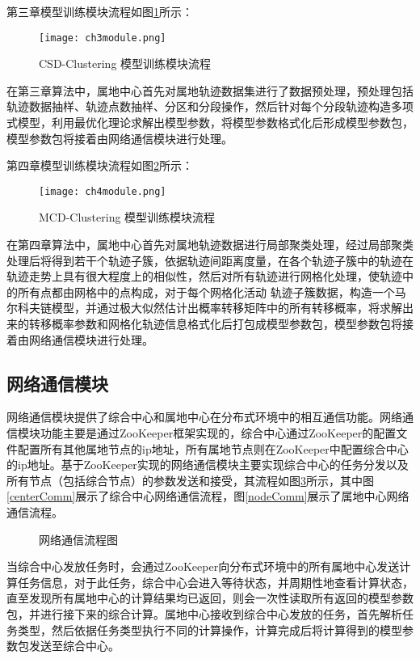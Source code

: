 第三章模型训练模块流程如图\ref{ch3module}所示：
\begin{figure}[h]
	\texttt{[image: ch3module.png]}
	\caption{CSD-Clustering 模型训练模块流程}
	\label{ch3module}
\end{figure}

在第三章算法中，属地中心首先对属地轨迹数据集进行了数据预处理，预处理包括轨迹数据抽样、轨迹点数抽样、分区和分段操作，然后针对每个分段轨迹构造多项式模型，利用最优化理论求解出模型参数，将模型参数格式化后形成模型参数包，模型参数包将接着由网络通信模块进行处理。

第四章模型训练模块流程如图\ref{ch4module}所示：
\begin{figure}[h]
	\texttt{[image: ch4module.png]}
	\caption{MCD-Clustering 模型训练模块流程}
	\label{ch4module}
\end{figure}

在第四章算法中，属地中心首先对属地轨迹数据进行局部聚类处理，经过局部聚类处理后将得到若干个轨迹子簇，依据轨迹间距离度量，在各个轨迹子簇中的轨迹在轨迹走势上具有很大程度上的相似性，然后对所有轨迹进行网格化处理，使轨迹中的所有点都由网格中的点构成，对于每个网格化活动 轨迹子簇数据，构造一个马尔科夫链模型，并通过极大似然估计出概率转移矩阵中的所有转移概率，将求解出来的转移概率参数和网格化轨迹信息格式化后打包成模型参数包，模型参数包将接着由网络通信模块进行处理。

\subsection{网络通信模块}

网络通信模块提供了综合中心和属地中心在分布式环境中的相互通信功能。网络通信模块功能主要是通过ZooKeeper框架实现的，综合中心通过ZooKeeper的配置文件配置所有其他属地节点的ip地址，所有属地节点则在ZooKeeper中配置综合中心的ip地址。基于ZooKeeper实现的网络通信模块主要实现综合中心的任务分发以及所有节点（包括综合节点）的参数发送和接受，其流程如图\ref{comm}所示，其中图\ref{centerComm}展示了综合中心网络通信流程，图\ref{nodeComm}展示了属地中心网络通信流程。
\begin{figure}[h]
\caption{网络通信流程图}
\label{comm}
\end{figure}

当综合中心发放任务时，会通过ZooKeeper向分布式环境中的所有属地中心发送计算任务信息，对于此任务，综合中心会进入等待状态，并周期性地查看计算状态，直至发现所有属地中心的计算结果均已返回，则会一次性读取所有返回的模型参数包，并进行接下来的综合计算。属地中心接收到综合中心发放的任务，首先解析任务类型，然后依据任务类型执行不同的计算操作，计算完成后将计算得到的模型参数包发送至综合中心。

